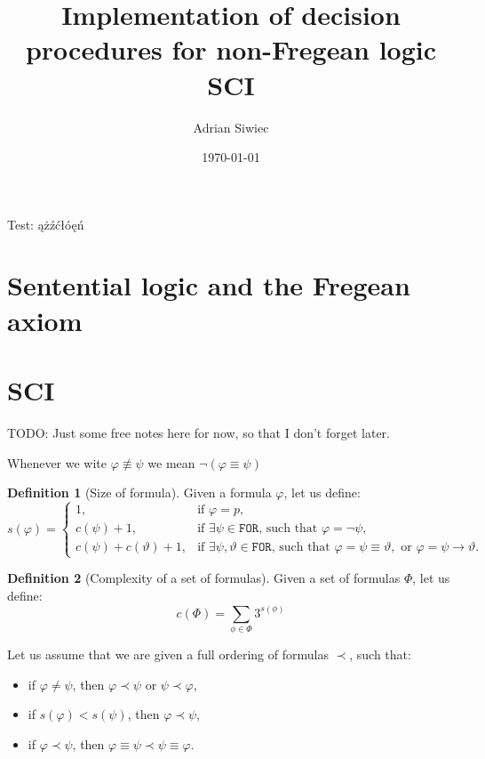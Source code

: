 \documentclass{article}
\title{Implementation of decision procedures for non-Fregean logic SCI}
\author{Adrian Siwiec}
\theoremstyle{definition}
\newtheorem{definition}{Definition}[section]
\newcommand*{\eq}{\equiv}
\newcommand*{\FOR}{\texttt{FOR}}
\begin{document}
\date{\today}

\maketitle

Test: ążźćłóęń

\section{Sentential logic and the Fregean axiom}
\section{SCI}
TODO: Just some free notes here for now, so that I don't forget later.


Whenever we wite $\varphi \not \eq \psi$ we mean $\lnot(\varphi \eq \psi)$

\begin{definition}[Size of formula]
    Given a formula $\varphi$, let us define:
    $$
        s(\varphi) = \begin{cases}
            1,                          & \text{if } \varphi = p,                                                                                                                    \\
            c(\psi) + 1,                & \text{if $\exists \psi \in \FOR$, such that } \varphi = \lnot \psi,                                                                        \\
            c(\psi) + c(\vartheta) + 1, & \text{if $\exists \psi, \vartheta \in \FOR$, such that } \varphi = \psi \equiv \vartheta,\text{ or } \varphi = \psi \rightarrow \vartheta.
        \end{cases}
    $$
\end{definition}
\begin{definition}[Complexity of a set of formulas]
    Given a set of formulas $\Phi$, let us define:
    $$
        c(\Phi) = \sum_{\phi \in \Phi} 3^{s(\phi)}
    $$
\end{definition}

Let us assume that we are given a full ordering of formulas $\prec$, such that:
\begin{itemize}
    \item if $\varphi \not = \psi$, then $\varphi \prec \psi$ or $\psi \prec \varphi$,
    \item if $s(\varphi) < s(\psi)$, then $\varphi \prec \psi$,
    \item if $\varphi \prec \psi$, then $\varphi \eq \psi \prec \psi \eq \varphi$.
\end{itemize}
\end{document}
